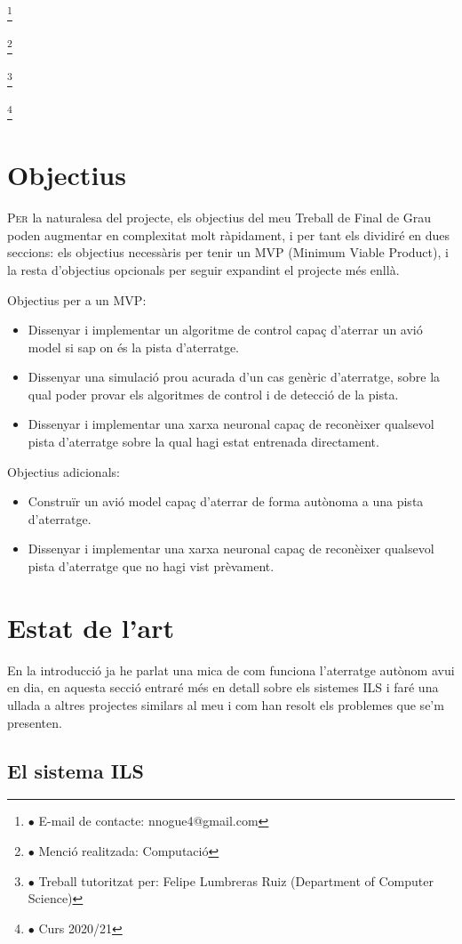 ﻿\documentclass[10pt,a4paper,twocolumn,twoside]{article}
\newcommand\blfootnote[1]{%
  \begingroup
  \renewcommand\thefootnote{}\footnote{#1}%
  \addtocounter{footnote}{-1}%
  \endgroup
}
\begin{document}
\blfootnote{$\bullet$ E-mail de contacte: nnogue4@gmail.com}
\blfootnote{$\bullet$ Menció realitzada: Computació}
\blfootnote{$\bullet$ Treball tutoritzat per: Felipe Lumbreras Ruiz (Department of Computer Science)}
\blfootnote{$\bullet$ Curs 2020/21}

\section{Objectius}

\lettrine[lines=3]{P}{er} la naturalesa del projecte, els objectius del meu Treball de Final de Grau poden
augmentar en complexitat molt ràpidament, i per tant els dividiré en dues seccions: els objectius necessàris per tenir un
MVP (Minimum Viable Product), i la resta d'objectius opcionals per seguir expandint el projecte més enllà.

Objectius per a un MVP:
\begin{itemize}
  \item Dissenyar i implementar un algoritme de control capaç d'aterrar un avió model si sap on és la pista d'aterratge.
  \item Dissenyar una simulació prou acurada d'un cas genèric d'aterratge, sobre la qual poder provar els algoritmes de control i de detecció de la pista.
  \item Dissenyar i implementar una xarxa neuronal capaç de reconèixer qualsevol pista d'aterratge sobre la qual hagi estat entrenada directament.
\end{itemize}
Objectius adicionals:
\begin{itemize}
\item Construïr un avió model capaç d'aterrar de forma autònoma a una pista d'aterratge.
\item Dissenyar i implementar una xarxa neuronal capaç de reconèixer qualsevol pista d'aterratge que no hagi vist prèvament.
\end{itemize}

\section{Estat de l'art}

En la introducció ja he parlat una mica de com funciona l'aterratge autònom avui en dia, en aquesta secció entraré més en detall
sobre els sistemes ILS i faré una ullada a altres projectes similars al meu i com han resolt els problemes que se'm presenten.

\subsection{El sistema ILS}
\label{subsec-exemple1}
\end{document}
